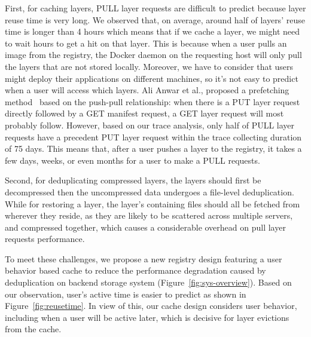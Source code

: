 First, for caching layers, PULL layer requests are difficult to predict because layer reuse time is very long. 
We observed that, on average, around half of layers' reuse time is longer than 4 hours which means 
that if we cache a layer, we might need to wait hours to get a hit on that layer.
This is because when a user pulls an image from the registry, the Docker daemon on the requesting host will only pull the layers that are not stored locally. 
Moreover, we have to consider that users might deploy their applications on different machines, so it's not easy to predict 
when a user will access which layers.
Ali Anwar et al., proposed a prefetching method~\cite{dockerworkload} based on the push-pull relationship: 
when there is a PUT layer request directly followed by a GET manifest request, a GET layer request will most probably follow.
However, based on our trace analysis, only half of PULL layer requests have a precedent PUT layer request within the trace collecting duration of 75 days. 
This means that,
after a user pushes a layer to the registry, it takes a few days, weeks, or even months for a user to make a PULL requests.

Second, for deduplicating compressed layers, 
the layers should first be decompressed then the uncompressed data undergoes a file-level deduplication. 
While for restoring a layer, the layer's containing files should all be fetched from wherever they reside, 
as they are likely to be scattered across multiple servers, 
and compressed together, which causes a considerable overhead on pull layer requests performance.

To meet these challenges, we propose a new registry design featuring a user behavior based cache to reduce the performance degradation caused by deduplication on backend storage system (Figure~\ref{fig:sys-overview}).
Based on our observation, user's active time is easier to predict as shown in Figure~\ref{fig:reusetime}.
In view of this, our cache design considers user behavior, including when a user will be active later, which is decisive for layer evictions from the cache.

